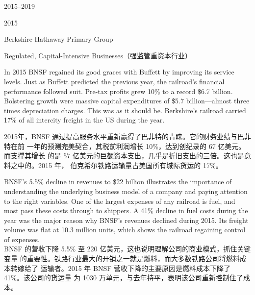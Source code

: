 \begin{chapter}{2015--2019}
\begin{section}{2015}
\begin{subsection}{Berkshire Hathaway Primary Group}
\end{subsection}

\begin{subsection}{Regulated, Capital-Intensive Businesses（强监管重资本行业）}
\begin{verseparallel}
  {

    In 2015 BNSF regained its good graces with Buffett by improving its service
    levels. Just as Buffett predicted the previous year, the railroad's
    financial performance followed suit. Pre-tax profits grew 10\% to a record
    \$6.7 billion. Bolstering growth were massive capital expenditures of \$5.7
    billion—almost three times depreciation charges. This was as it should be. Berkshire's railroad carried
    17\% of all intercity freight in the
    US during the year. \\

  }
  {
    2015年，BNSF 通过提高服务水平重新赢得了巴菲特的青睐。它的财务业绩与巴菲特在前
    一年的预测完美契合，其税前利润增长 10\%，达到创纪录的 67 亿美元。而支撑其增长
    的是 57 亿美元的巨额资本支出，几乎是折旧支出的三倍。这也是意料之中的。2015 年，
    伯克希尔铁路运输量占美国所有城际货运的 17\%。
  }
\end{verseparallel}

\begin{verseparallel}
  {
    BNSF's 5.5\% decline in revenues to \$22 billion illustrates the importance
    of understanding the underlying business model of a company and paying
    attention to the right variables. One of the largest expenses of any
    railroad is fuel, and most pass these costs through to shippers. A 41\%
    decline in fuel costs during the year was the major reason why BNSF's
    revenues declined during 2015. Its freight volume was flat at 10.3 million
    units, which shows the railroad regaining control of expenses. \\
  }
  {
    BNSF 的营收下降 5.5\% 至 220 亿美元，这也说明理解公司的商业模式，抓住关键变量
    的重要性。铁路行业最大的开销之一就是燃料，而大多数铁路公司将燃料成本转嫁给了
    运输者。2015 年 BNSF 营收下降的主要原因是燃料成本下降了 41\%。该公司的货运量
    为 1030 万单元，与去年持平，表明该公司重新控制住了成本。
  }
\end{verseparallel}


\end{subsection}
\end{section}
\end{chapter}
